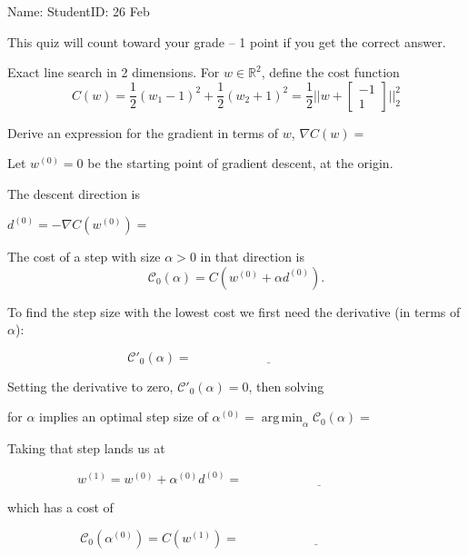 \documentclass[12pt]{article}
\DeclareMathOperator*{\argmin}{arg\,min}
\begin{document}
\thispagestyle{empty}

Name: \underline{\hspace{2in}} StudentID: \underline{\hspace{2in}} 26 Feb

This quiz will count toward your grade -- 1 point if you get the
correct answer.

Exact line search in 2 dimensions. For $w\in\mathbb R^2$, define the
cost function
$$C(w) = \frac 1 2 (w_1-1)^2 + \frac 1 2 (w_2+1)^2 = \frac 1 2 ||w +
\left[\begin{array}{c}
  -1\\
   1
\end{array}\right]
||^2_2$$

\vskip 1cm
Derive an expression for the gradient in terms of $w$, $\nabla C(w)=$\underline{\hspace{2in}}

Let $w^{(0)}=0$ be the starting point of gradient descent, at the
origin. 

\vskip 1cm
The descent direction is

$d^{(0)} = -\nabla C(w^{(0)})=$\underline{\hspace{2in}}

The cost of a step with size $\alpha>0$ in that direction is
\begin{equation*}
  \mathcal C_0(\alpha) = C(w^{(0)} + \alpha d^{(0)}).
\end{equation*}

To find the step size with the lowest cost we first need the derivative
(in terms of $\alpha$):

\vskip 1cm
\begin{equation*}
  \mathcal C'_0(\alpha) = \underline{\hspace{2in}}
\end{equation*}

\vskip 1cm 

Setting the derivative to zero, $\mathcal C'_0(\alpha)=0$,
then solving 

for $\alpha$
implies an optimal step size of
$\alpha^{(0)}=\argmin_\alpha \mathcal
C_0(\alpha)=$\underline{\hspace{2in}}

\vskip 1cm
Taking that step lands us at 

\begin{equation*}
  w^{(1)} = w^{(0)} + \alpha^{(0)} d^{(0)} = \underline{\hspace{2in}}
\end{equation*}

\vskip 1cm
which has a cost of

\begin{equation*}
  \mathcal C_0(\alpha^{(0)}) = C(w^{(1)}) = \underline{\hspace{2in}}
\end{equation*}
\end{document}
